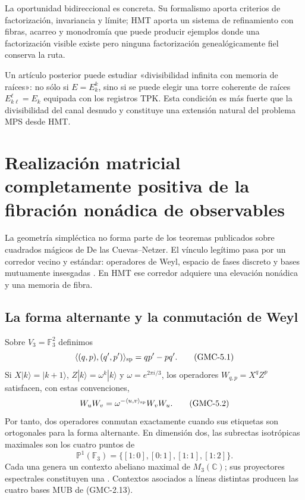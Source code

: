La oportunidad bidireccional es concreta. Su formalismo aporta criterios de
factorización, invariancia y límite; HMT aporta un sistema de refinamiento con
fibras, acarreo y monodromía que puede producir ejemplos donde una
factorización visible existe pero ninguna factorización genealógicamente fiel
conserva la ruta.

\begin{workbox}
Un artículo posterior puede estudiar «divisibilidad infinita con memoria de
raíces»: no sólo si $E=E_k^k$, sino si se puede elegir una torre coherente de
raíces $E_{k\ell}^\ell=E_k$ equipada con los registros TPK. Esta condición es
más fuerte que la divisibilidad del canal desnudo y constituye una extensión
natural del problema MPS desde HMT.
\end{workbox}
\fi


\section{Realización matricial completamente positiva de la fibración nonádica de observables}
\label{p12-83-c22-s8:gmc:chap:simplectica}

La geometría simpléctica no forma parte de los teoremas publicados sobre
cuadrados mágicos de De las Cuevas--Netzer. El vínculo legítimo pasa por un
corredor vecino y estándar: operadores de Weyl, espacio de fases discreto y
bases mutuamente insesgadas \citep{gibbons2004phase,planat2007rings}. En HMT
ese corredor adquiere una elevación nonádica y una memoria de fibra.

\subsection{La forma alternante y la conmutación de Weyl}

Sobre $V_3=\mathbb F_3^2$ definimos
\[
 \langle(q,p),(q',p')\rangle_{\rm sp}=qp'-pq'.
 \tag{GMC-5.1}
\]
Si $X|k\rangle=|k+1\rangle$,
$Z|k\rangle=\omega^k|k\rangle$ y $\omega=e^{2\pi i/3}$, los operadores
$W_{q,p}=X^qZ^p$ satisfacen, con estas convenciones,
\[
 W_uW_v=\omega^{-\langle u,v\rangle_{\rm sp}}W_vW_u.
 \tag{GMC-5.2}
\]
Por tanto, dos operadores conmutan exactamente cuando sus etiquetas son
ortogonales para la forma alternante. En dimensión dos, las subrectas
isotrópicas maximales son los cuatro puntos de
\[
 \mathbb P^1(\mathbb F_3)=\{[1:0],[0:1],[1:1],[1:2]\}.
 \tag{GMC-5.3}
\]
Cada una genera un contexto abeliano maximal de $M_3(\mathbb C)$; sus
proyectores espectrales constituyen una \PVM. Contextos asociados a líneas
distintas producen las cuatro bases MUB de \textup{(GMC-2.13)}.

